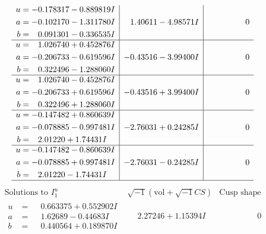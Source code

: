 \documentclass[1p]{elsarticle_modified}
\theoremstyle{definition}
\newcommand{\I}{\sqrt{-1}}
\begin{document}
$$\begin{array}{c|c|c}
\begin{aligned}
u &= -0.178317 - 0.889819 I \\
a &= -0.102170 - 1.311780 I \\
b &= \phantom{-}0.091301 - 0.336535 I\end{aligned}
 & \phantom{-}1.40611 - 4.98571 I & \phantom{-0.000000 } 0 \\ \hline\begin{aligned}
u &= \phantom{-}1.026740 + 0.452876 I \\
a &= -0.206733 - 0.619596 I \\
b &= \phantom{-}0.322496 - 1.288060 I\end{aligned}
 & -0.43516 - 3.99400 I & \phantom{-0.000000 } 0 \\ \hline\begin{aligned}
u &= \phantom{-}1.026740 - 0.452876 I \\
a &= -0.206733 + 0.619596 I \\
b &= \phantom{-}0.322496 + 1.288060 I\end{aligned}
 & -0.43516 + 3.99400 I & \phantom{-0.000000 } 0 \\ \hline\begin{aligned}
u &= -0.147482 + 0.860639 I \\
a &= -0.078885 - 0.997481 I \\
b &= \phantom{-}2.01220 + 1.74431 I\end{aligned}
 & -2.76031 + 0.24285 I & \phantom{-0.000000 } 0 \\ \hline\begin{aligned}
u &= -0.147482 - 0.860639 I \\
a &= -0.078885 + 0.997481 I \\
b &= \phantom{-}2.01220 - 1.74431 I\end{aligned}
 & -2.76031 - 0.24285 I & \phantom{-0.000000 } 0\\
 \hline 
 \end{array}$$\newpage$$\begin{array}{c|c|c}  
\text{Solutions to }I^u_{1}& \I (\text{vol} + \sqrt{-1}CS) & \text{Cusp shape}\\
 \hline 
\begin{aligned}
u &= \phantom{-}0.663375 + 0.552902 I \\
a &= \phantom{-}1.62689 - 0.44683 I \\
b &= \phantom{-}0.440564 + 0.189870 I\end{aligned}
 & \phantom{-}2.27246 + 1.15394 I & \phantom{-0.000000 } 0 \\ \hline\begin{aligned}

\end{aligned}
\end{array}$$
\end{document}

